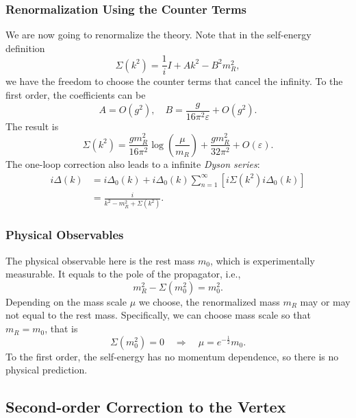 \subsubsection{Renormalization Using the Counter Terms}
We are now going to renormalize the theory.
Note that in the self-energy definition
\begin{equation}
	\Sigma(k^2) = \frac{1}{i} I + A k^2-B^2 m_R^2,
\end{equation}
we have the freedom to choose the counter terms that cancel the infinity.
To the first order, the coefficients can be
\begin{equation}
	A = O(g^2), \quad
	B = \frac{g}{16\pi^2 \varepsilon} + O(g^2).
\end{equation}
The result is
\begin{equation}
	\Sigma(k^2) = \frac{g m_R^2}{16\pi^2} \log \left(\frac{\mu}{m_R}\right)
	+\frac{g m_R^2}{32\pi^2}+O(\varepsilon).
\end{equation}
The one-loop correction also leads to a infinite \textit{Dyson series}:
\begin{equation}
\begin{aligned}
	i\Delta(k) &= i\Delta_0(k) + i\Delta_0(k)\sum_{n=1}^\infty \left[i\Sigma(k^2)i\Delta_0(k)\right] \\
	&= \frac{i}{k^2 -m_R^2 + \Sigma(k^2)}.
\end{aligned}
\end{equation}



\subsubsection{Physical Observables}
The physical observable here is the rest mass $m_0$, which is experimentally measurable.
It equals to the pole of the propagator, i.e.,
\begin{equation}
	m_R^2 - \Sigma(m_0^2) = m_0^2.
\end{equation}
Depending on the mass scale $\mu$ we choose, the renormalized mass $m_R$ may or may not equal to the rest mass.
Specifically, we can choose mass scale so that $m_R = m_0$, that is
\begin{equation}
	\Sigma(m_0^2) = 0 \quad \Longrightarrow \quad
	\mu = e^{-\frac{1}{2}} m_0.
\end{equation}
To the first order, the self-energy has no momentum dependence, so there is no physical prediction.




\subsection{Second-order Correction to the Vertex}

